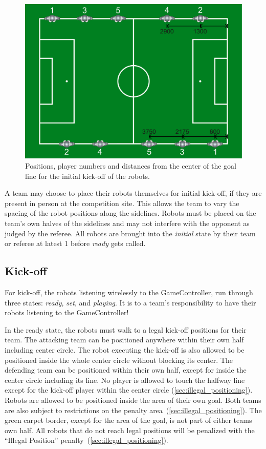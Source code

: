 \begin{figure}[t!]
	\begin{center}
		\leavevmode
		\includegraphics[width=1\columnwidth]{figs/initial_positions.pdf}
		\caption{Positions, player numbers and distances from the center of the goal line for the initial kick-off of the robots.}
		\label{fig:initial_positions}
	\end{center}
\end{figure}

A team may choose to place their robots themselves for initial kick-off, if they are present in person at the competition site. This allows the team to vary the spacing of the robot positions along the sidelines. Robots must be placed on the team's own halves of the sidelines and may not interfere with the opponent as judged by the referee. All robots are brought into the \textit{initial} state by their team or referee at latest \qty{1}{\min} before \textit{ready} gets called.

\subsection{Kick-off}
\label{sec:kick-off}
For kick-off, the robots listening wirelessly to the GameController, run through three states: \emph{ready}, \emph{set}, and \emph{playing}.
It is to a team's responsibility to have their robots listening to the GameController!

In the ready state, the robots must walk to a legal kick-off positions for their team.
The attacking team can be positioned anywhere within their own half including center circle. The robot executing the kick-off is also allowed to be positioned inside the whole center circle without blocking its center.
The defending team can be positioned within their own half, except for inside the center circle including its line.
No player is allowed to touch the halfway line except for the kick-off player within the center circle (\cf \cref{sec:illegal_positioning}). Robots are allowed to be positioned inside the area of their own goal.
Both teams are also subject to restrictions on the penalty area~(\cf \cref{sec:illegal_positioning}).
The green carpet border, except for the area of the goal, is not part of either teams own half. All robots that do not reach legal positions will be penalized with the ``Illegal Position'' penalty~(\cf \cref{sec:illegal_positioning}).

